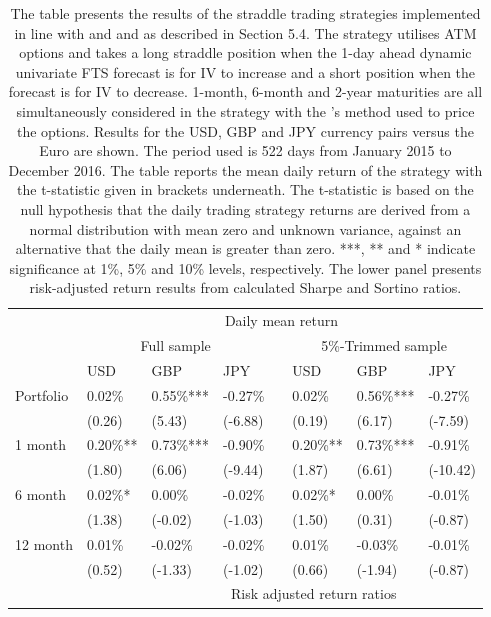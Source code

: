 \documentclass[12pt,a4paper]{article}
\begin{document}
\begin{table}[!htbp]
\centering
\tabcolsep 0.18in
\caption{\small{The table presents the results of the straddle trading strategies implemented in line with \cite{BG14} and \cite{KCM18} and as described in Section 5.4. The strategy utilises ATM options and takes a long straddle position when the 1-day ahead dynamic univariate FTS forecast is for IV to increase and a short position when the forecast is for IV to decrease. 1-month, 6-month and 2-year maturities are all simultaneously considered in the strategy with the \citeauthor{GK83}'s \citeyearpar{GK83} method used to price the options. Results for the USD, GBP and JPY currency pairs versus the Euro are shown. The period used is 522 days from January 2015 to December 2016. The table reports the mean daily return of the strategy with the t-statistic given in brackets underneath. The t-statistic is based on the null hypothesis that the daily trading strategy returns are derived from a normal distribution with mean zero and unknown variance, against an alternative that the daily mean is greater than zero. ***, ** and * indicate significance at 1\%, 5\% and 10\% levels, respectively. The lower panel presents risk-adjusted return results from calculated Sharpe and Sortino ratios.}}\label{tab:Trading_Srategy}
\begin{tabular}{@{}llllllll@{}}
\toprule
 & \multicolumn{7}{c}{Daily mean return} \\
 & \multicolumn{3}{c}{Full sample} &  & \multicolumn{3}{c}{5\%-Trimmed sample} \\
\midrule
 & USD & GBP & JPY &  & USD & GBP & JPY \\
Portfolio & 0.02\% & 0.55\%*** & -0.27\% &  & 0.02\% & 0.56\%*** & -0.27\% \\
 & (0.26) & (5.43) & (-6.88) &  & (0.19) & (6.17) & (-7.59) \\
1 month & 0.20\%** & 0.73\%*** & -0.90\% &  & 0.20\%** & 0.73\%*** & -0.91\% \\
 & (1.80) & (6.06) & (-9.44) &  & (1.87) & (6.61) & (-10.42) \\
6 month & 0.02\%* & 0.00\% & -0.02\% &  & 0.02\%* & 0.00\% & -0.01\% \\
 & (1.38) & (-0.02) & (-1.03) &  & (1.50) & (0.31) & (-0.87) \\
12 month & 0.01\% & -0.02\% & -0.02\% &  & 0.01\% & -0.03\% & -0.01\% \\
 & (0.52) & (-1.33) & (-1.02) &  & (0.66) & (-1.94) & (-0.87)\\
\midrule
& & \multicolumn{6}{c}{Risk adjusted return ratios}                                            \\

\end{tabular}
\end{table}
\end{document}
